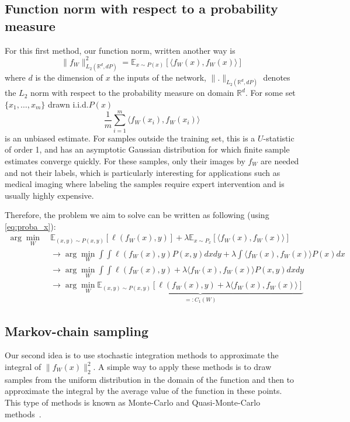 \documentclass{article}
\begin{document}
\subsection{Function norm with respect to a probability measure}
For this first method, our function norm, written another way is
\begin{equation}
\| f_W\|_{L_2(\mathbb{R}^d, dP)}^2 = \mathbb{E}_{x \sim P(x)} \left[ \langle f_W(x), f_W(x) \rangle \right]
\end{equation}
where $d$ is the dimension of  $x$ the inputs of the network, $\| .\|_{L_2(\mathbb{R}^d, dP)}$ denotes the $L_2$ norm with respect to the probability measure on domain $\mathbb{R}^d$.  For some set $\{x_1, \dots ,x_m\}$ drawn i.i.d.\from $P(x)$
\begin{equation}
\frac{1}{m} \sum_{i=1}^m  \langle f_W(x_i), f_W(x_i) \rangle
\end{equation}
is an unbiased estimate.  For samples outside the training set, this is a $U$-statistic of order 1, and has an asymptotic Gaussian distribution for which finite sample estimates converge quickly\cite{lee1990u}.
For these samples, only their images by $f_W$ are needed and not their labels, which is particularly interesting for applications such as medical imaging 
where labeling the samples require expert intervention and is usually highly expensive.

Therefore, the problem we aim to solve can be written as following (using \eqref{eq:proba_x}):
\begin{align}
\arg\min_{W} \ &  \mathbb{E}_{(x,y)\sim P(x,y)}[\ell(f_W(x),y)] + \lambda \mathbb{E}_{x\sim P_x}[ \langle f_W(x), f_W(x) \rangle]\nonumber \\ &\rightarrow  \arg\min_{W} \int \int \ell(f_W(x),y) P(x,y) dxdy + \lambda \int \langle f_W(x), f_W(x) \rangle P(x) dx \nonumber \\ &\rightarrow  \arg\min_{W}\int \int \ell(f_W(x),y) + \lambda \langle f_W(x), f_W(x) \rangle  P(x,y) dxdy \nonumber \\ &\rightarrow \arg\min_{W} \underbrace{\mathbb{E}_{(x,y)\sim P(x,y)} [\ell(f_W(x),y) + \lambda \langle f_W(x), f_W(x) \rangle]}_{=: C_1(W)} 
\end{align}

\subsection{Markov-chain sampling}
Our second idea is to use stochastic integration methods to approximate the integral of $\| f_W(x)\|_2^2$. A simple way to apply these methods is to draw samples from the uniform distribution in the domain of the function and then to approximate the integral by the average value of the function in these points. This type of methods is known as Monte-Carlo and Quasi-Monte-Carlo methods~\cite{caflisch1998monte}.
\end{document}
